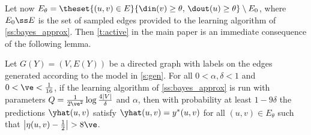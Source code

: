 Let now $E_{\theta} = \theset{(u,v) \in E}{\din(v) \ge \theta,\, \dout(u) \ge \theta} \setminus
E_0$, where $E_0 \ss E$ is the set of sampled edges provided to the learning algorithm of
\autoref{ss:bayes_approx}. Then \autoref{t:active} in the main paper is an immediate consequence of the
following lemma. 

\begin{lemma}\label{l:active}
Let $G(Y) = (V,E(Y))$ be a directed graph with labels on the edges generated according to the model
in \autoref{s:gen}.
For all $0 < \alpha,\delta < 1$ and $0 < \ve < \tfrac{1}{16}$, if the learning algorithm of
\autoref{ss:bayes_approx} is run with parameters $Q = \tfrac{1}{2\ve^2}\log\frac{4|V|}{\delta}$ and
$\alpha$, then with probability at least $1-9\delta$ the predictions $\yhat(u,v)$ satisfy
$\yhat(u,v) = y^*(u,v)$ for all $(u,v) \in E_{\theta}$ such that $\big|\eta(u,v) - \tfrac{1}{2}\big|
> 8\ve$.
\end{lemma}

